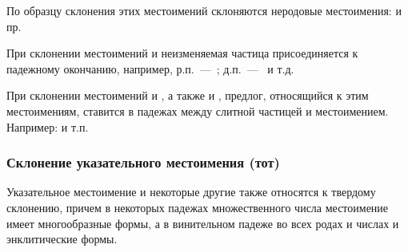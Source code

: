 \documentclass[11pt,a4paper,oneside]{memoir}
\begin{document}
    По образцу склонения этих местоимений склоняются неродовые местоимения: {} и пр.
    
    При склонении местоимений {} и {} неизменяемая частица {} присоединяется к падежному окончанию, например, р.п.~---~{}; д.п.~---~{} и т.д.
    
    При склонении местоимений {} и {}, а также {} и {}, предлог, относящийся к этим местоимениям, ставится в падежах между слитной частицей {} и местоимением. Например: {} и т.п.

                \subsubsection{Склонение указательного местоимения {} (тот)}

    Указательное местоимение {} и некоторые другие также относятся к твердому склонению, причем в некоторых падежах множественного числа местоимение {} имеет многообразные формы, а в винительном падеже во всех родах и числах и энклитические формы.
\end{document}
